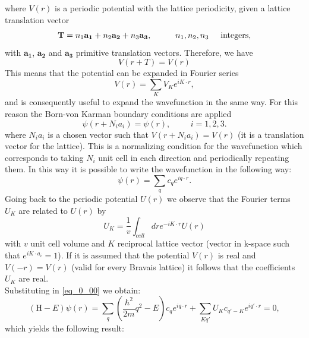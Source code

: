 \documentclass[12pt, a4paper]{report}
\numberwithin{equation}{section}
\begin{document}
where $V(r)$ is a periodic potential with the lattice periodicity, given a lattice translation vector
\begin{equation}
    \mathbf{T}=n_1\mathbf{a_1}+n_2\mathbf{a_2}+n_3\mathbf{a_3},\hspace{1cm}n_1,n_2,n_3\hspace{0.5cm}\mathrm{integers},
\end{equation}
with $\mathbf{a_1}$, $\mathbf{a_2}$ and $\mathbf{a_3}$ primitive translation vectors.
Therefore, we have
\begin{equation}
    V(r+T)=V(r)
\end{equation}
This means that the potential can be expanded in Fourier series
\begin{equation}
    V(r)=\sum_KV_Ke^{iK\cdot r},
\end{equation}
and is consequently useful to expand the wavefunction in the same way. For this reason the Born-von Karman boundary conditions
are applied \cite{Ashcroft76}
\begin{equation}
    \psi(r+N_ia_i)=\psi(r),\hspace{1cm}i=1,2,3.
\end{equation}
where $N_ia_i$ is a chosen vector such that $V(r+N_ia_i)=V(r)$ (it is a translation vector for the lattice). This is a normalizing
condition for the wavefunction which corresponds to taking $N_i$ unit cell in each direction and periodically repeating them. In this 
way it is possible to write the wavefunction in the following way:
\begin{equation}
    \psi(r)=\sum_qc_qe^{iq\cdot r}.
    \label{eq_0_01}
\end{equation}
Going back to the periodic potential $U(r)$ we observe that the Fourier terms $U_K$ are related to $U(r)$ by
\begin{equation}
    U_K=\frac{1}{v}\int_{cell}dre^{-iK\cdot r}U(r)
\end{equation}
with $v$ unit cell volume and $K$ reciprocal lattice vector (vector in k-space such that $e^{iK\cdot a_i}=1$). If it is 
assumed that the potential $V(r)$ is real and $V(-r)=V(r)$ (valid for every Bravais lattice) it follows that the coefficients 
$U_K$ are real.\\
Substituting in \ref{eq_0_00} we obtain:
\begin{equation}
    (\mathrm{H}-E)\psi(r)=\sum_q\left(\frac{\hbar^2}{2m}q^2-E\right)c_qe^{iq\cdot r}+\sum_{Kq'}U_Kc_{q'-K}e^{iq'\cdot r}=0,
\end{equation}
which yields the following result:
\end{document}
